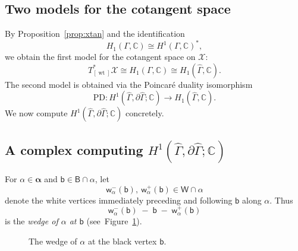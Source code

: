 \documentclass[dvipsnames,11pt]{article}
\theoremstyle{definition}
\newcommand{\wt}{\operatorname{wt}}
\newcommand{\C}{{\mathbb C}}
\def\B{\mathsf B}
\def\W{\mathsf W}
\def\w{\mathsf w}
\def\b{\mathsf b}
\def\zz{\bm \alpha}
\def\PD{\mathrm{PD}}
\newcommand{\la}{\label}
\begin{document}
\subsection{Two models for the cotangent space}

By Proposition~\ref{prop:xtan} and the identification
\[
H_1(\Gamma,\C) \cong H^1(\Gamma,\C)^*,
\]
we obtain the first model for the cotangent space on \(\mathcal X\):
\[
T^*_{[\wt]}\mathcal X \cong H_1(\Gamma,\C)\cong H_1(\widehat\Gamma,\C).
\]
The second model is obtained via the Poincar\'e duality isomorphism
\[
\PD: H^1(\widehat\Gamma,\partial\widehat\Gamma;\C) \rightarrow H_1(\widehat\Gamma,\C).
\]
We now compute \(H^1(\widehat\Gamma,\partial\widehat\Gamma;\C)\) concretely.

\subsection{A complex computing \texorpdfstring{$H^1(\widehat\Gamma,\partial\widehat\Gamma;\C)$}{the relative cohomology}}
\label{sec:complex_for_relcoh}

For \(\alpha\in\zz\) and \(\b\in\B\cap\alpha\), let
\[
\w_\alpha^{-}(\b),\ \w_\alpha^{+}(\b)\in \W\cap\alpha
\]
denote the white vertices immediately preceding and following \(\b\) along \(\alpha\). Thus
\[
\w_\alpha^{-}(\b)\;-\;\b\;-\;\w_\alpha^{+}(\b)
\]
is the \emph{wedge of \(\alpha\) at \(\b\)} (see~Figure~\ref{fig:wedge}).

\begin{figure}
\begin{center}
\end{center}
\caption{The wedge of $\alpha$ at the black vertex \(\b\).}
\la{fig:wedge}
\end{figure}
\end{document}
